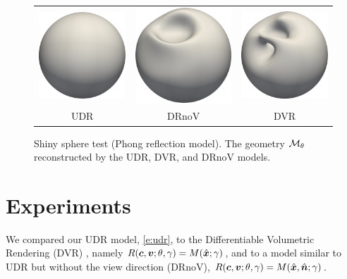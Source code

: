 \documentclass[runningheads]{llncs}
\begin{document}
\begin{figure}[t]
    \centering
    \begingroup
\setlength{\tabcolsep}{10pt} %
    \begin{tabular}{ccc}
         \includegraphics[width=0.25\columnwidth]{color/udr/sphere_udr.png} &
         \includegraphics[width=0.25\columnwidth]{color/udr_minus/sphere_udr_minus.png} &   \includegraphics[width=0.25\columnwidth]{color/dvr/sphere_dvr.png}  \\
          UDR & DRnoV & DVR 
    \end{tabular}
    \endgroup
    \caption{Shiny sphere test (Phong reflection model). The geometry ${\mathcal{M}}_\theta$ reconstructed by the UDR, DVR, and DRnoV models.}
    \label{fig:sphere_geometry}
\end{figure}

\pagebreak
\section{Experiments}

We compared our UDR model, \eqref{e:udr}, to the Differentiable Volumetric Rendering (DVR) \cite{niemeyer2019differentiable}, namely $R({\bm{c}},{\bm{v}};\theta,\gamma) = M({\hat{\bm{x}}};\gamma)$, and to a model similar to UDR but without the view direction (DRnoV), $R({\bm{c}},{\bm{v}};\theta,\gamma) = M({\hat{\bm{x}}},{\hat{\bm{n}}};\gamma)$.
\end{document}
